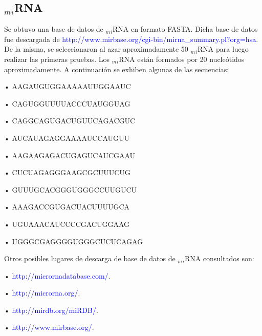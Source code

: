 \documentclass[12pt,a4paper,spanish]{article}
\begin{document}
	\subsection{$_m$$_i$RNA}
		\par Se obtuvo una base de datos de $_m$$_i$RNA en formato FASTA. Dicha base de datos fue descargada de
		\textcolor{blue}{http://www.mirbase.org/cgi-bin/mirna\_summary.pl?org=hsa}. De la misma, se seleccionaron al azar 		aproximadamente 50 $_m$$_i$RNA para luego realizar las primeras pruebas. Los $_m$$_i$RNA están formados por 20 			nucleótidos aproximadamente. A continuación se exhiben algunas de las secuencias: 
			\vskip 0.5cm
			\par \hspace*{1cm} • \textsc{AAGAUGUGGAAAAAUUGGAAUC}
			\vskip 0.20cm
			\par \hspace*{1cm} • \textsc{CAGUGGUUUUACCCUAUGGUAG}
			\vskip 0.20cm
			\par \hspace*{1cm} • \textsc{CAGGCAGUGACUGUUCAGACGUC}
			\vskip 0.20cm
			\par \hspace*{1cm} • \textsc{AUCAUAGAGGAAAAUCCAUGUU}
			\vskip 0.20cm
			\par \hspace*{1cm} • \textsc{AAGAAGAGACUGAGUCAUCGAAU}
			\vskip 0.20cm
			\par \hspace*{1cm} • \textsc{CUCUAGAGGGAAGCGCUUUCUG}
			\vskip 0.20cm
			\par \hspace*{1cm} • \textsc{GUUUGCACGGGUGGGCCUUGUCU}
			\vskip 0.20cm
			\par \hspace*{1cm} • \textsc{AAAGACCGUGACUACUUUUGCA}
			\vskip 0.20cm
			\par \hspace*{1cm} • \textsc{UGUAAACAUCCCCGACUGGAAG}
			\vskip 0.20cm
			\par \hspace*{1cm} • \textsc{UGGGCGAGGGGUGGGCUCUCAGAG} 
			\vskip 0.5cm

		\par Otros posibles lugares de descarga de base de datos de $_m$$_i$RNA consultados son: 
			\par \hspace*{1cm} • \textcolor{blue}{http://micrornadatabase.com/}.
			\par \hspace*{1cm} • \textcolor{blue}{http://microrna.org/}.
			\par \hspace*{1cm} • \textcolor{blue}{http://mirdb.org/miRDB/}.
			\par \hspace*{1cm} • \textcolor{blue}{http://www.mirbase.org/}.
\end{document}
